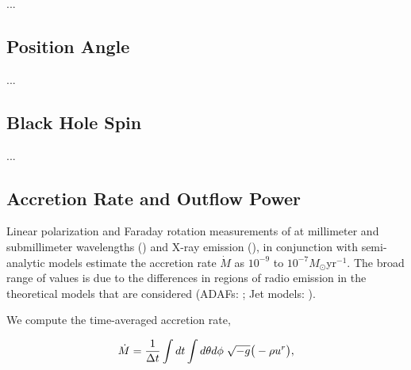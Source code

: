 
...

\subsection{Position Angle}


...

\subsection{Black Hole Spin}


...

\subsection{Accretion Rate and Outflow Power}


Linear polarization and Faraday rotation measurements of \sgra at millimeter and submillimeter wavelengths (\citealt{2000ApJ...538L.121A, 2000ApJ...545..842Q, Bower_2003, Marrone_2006, 2006JPhCS..54..354M, 2006ApJ...646L.111M}) and X-ray emission  (\citealt{2003ApJ...591..891B, doi:10.1126/science.1240755}), in conjunction with semi-analytic models estimate the accretion rate $\dot{M}$ as $10^{-9}$ to $10^{-7} M_{\odot}$yr$^{-1}$. The broad range of values is due to the differences in regions of radio emission in the theoretical models that are considered (ADAFs: \citealt{1998ApJ...492..554N, Yuan_2003}; Jet models: \citealt{1993A&A...278L...1F, 2000A&A...362..113F}).

We compute the time-averaged accretion rate,

\begin{equation}
    \dot{M} = \frac{1}{\Delta t}\int dt\int d\theta d\phi\hspace{0.1cm}\sqrt{-g}\big(-\rho u^{r}\big),
\end{equation}

